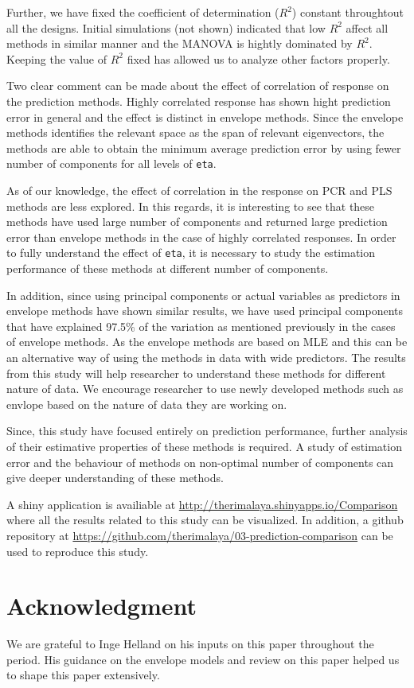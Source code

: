\documentclass[12pt,3p,authoryear]{elsarticle}
\begin{document}
Further, we have fixed the coefficient of determination (\(R^2\))
constant throughtout all the designs. Initial simulations (not shown)
indicated that low \(R^2\) affect all methods in similar manner and the
MANOVA is hightly dominated by \(R^2\). Keeping the value of \(R^2\)
fixed has allowed us to analyze other factors properly.

Two clear comment can be made about the effect of correlation of
response on the prediction methods. Highly correlated response has shown
hight prediction error in general and the effect is distinct in envelope
methods. Since the envelope methods identifies the relevant space as the
span of relevant eigenvectors, the methods are able to obtain the
minimum average prediction error by using fewer number of components for
all levels of \texttt{eta}.

As of our knowledge, the effect of correlation in the response on PCR
and PLS methods are less explored. In this regards, it is interesting to
see that these methods have used large number of components and returned
large prediction error than envelope methods in the case of highly
correlated responses. In order to fully understand the effect of
\texttt{eta}, it is necessary to study the estimation performance of
these methods at different number of components.

In addition, since using principal components or actual variables as
predictors in envelope methods have shown similar results, we have used
principal components that have explained 97.5\% of the variation as
mentioned previously in the cases of envelope methods. As the envelope
methods are based on MLE and this can be an alternative way of using the
methods in data with wide predictors. The results from this study will
help researcher to understand these methods for different nature of
data. We encourage researcher to use newly developed methods such as
envlope based on the nature of data they are working on.

Since, this study have focused entirely on prediction performance,
further analysis of their estimative properties of these methods is
required. A study of estimation error and the behaviour of methods on
non-optimal number of components can give deeper understanding of these
methods.

A shiny application \citep{shiny} is availiable at
\url{http://therimalaya.shinyapps.io/Comparison} where all the results
related to this study can be visualized. In addition, a github
repository at
\url{https://github.com/therimalaya/03-prediction-comparison} can be
used to reproduce this study.

\section{Acknowledgment}\label{acknowledgment}

We are grateful to Inge Helland on his inputs on this paper throughout
the period. His guidance on the envelope models and review on this paper
helped us to shape this paper extensively.

\hypertarget{refs}{}

\appendix



\renewcommand\refname{References}

\end{document}
